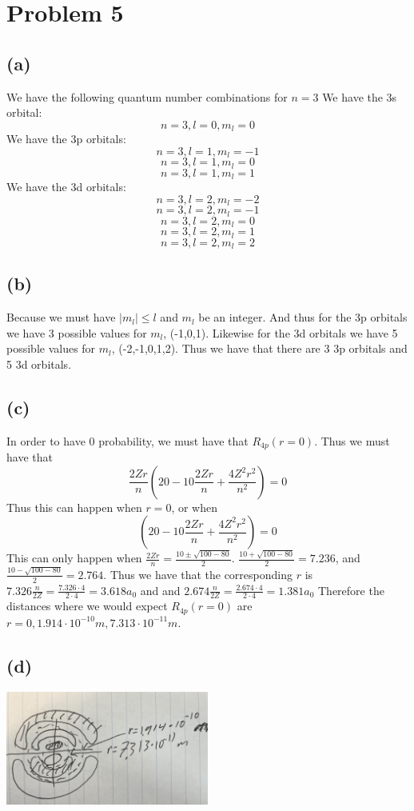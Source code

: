 \section*{Problem 5}
\subsection*{(a)}
We have the following quantum number combinations for $n=3$
We have the 3s orbital:
$$n=3, l=0, m_l=0$$
We have the 3p orbitals:
$$n=3, l=1, m_l=-1$$
$$n=3, l=1, m_l=0$$
$$n=3, l=1, m_l=1$$
We have the 3d orbitals:
$$n=3, l=2, m_l=-2$$
$$n=3, l=2, m_l=-1$$
$$n=3, l=2, m_l=0$$
$$n=3, l=2, m_l=1$$
$$n=3, l=2, m_l=2$$
\subsection*{(b)}
Because we must have $|m_l|\leq l$ and $m_l$ be an integer. And thus for the 
3p orbitals we have 3 possible values for $m_l$, (-1,0,1).
Likewise for the 3d orbitals we have 5 possible values for $m_l$, 
(-2,-1,0,1,2). Thus we have that there are 3 
3p orbitals and 5 3d orbitals.
\subsection*{(c)}
In order to have 0 probability, 
we must have that $R_{4p}(r=0)$. Thus we must have that 
$$\frac{2Zr}{n}\left(20-10\frac{2Zr}{n}+\frac{4Z^2r^2}{n^2}\right)=0$$
Thus this can happen when $r=0$, or when 
$$\left(20-10\frac{2Zr}{n}+\frac{4Z^2r^2}{n^2}\right)=0$$
This can only happen when $\frac{2Zr}{n}=\frac{10\pm\sqrt{100-80}}{2}$.
$\frac{10+\sqrt{100-80}}{2}=7.236$, and 
$\frac{10-\sqrt{100-80}}{2}=2.764$. Thus we have that the corresponding 
$r$ is $7.326\frac{n}{2Z}=\frac{7.326\cdot 4}{2\cdot 4}=3.618a_0$ and
and $2.674\frac{n}{2Z}=\frac{2.674\cdot 4}{2\cdot 4}=1.381a_0$
Therefore the distances where we would expect 
$R_{4p}(r=0)$ are $r=0,1.914\cdot10^{-10}m, 7.313\cdot10^{-11}m$.
\subsection*{(d)}
\includegraphics[width=0.5\textwidth]{5d.png}



